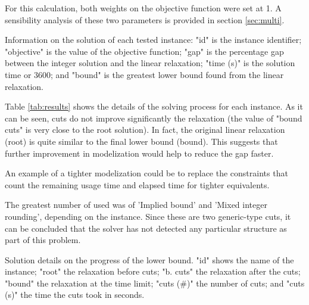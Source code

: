 \documentclass[a4paper,twocolumn,fleqn]{article}
\begin{document}
    For this calculation, both weights on the objective function were set at 1. A sensibility analysis of these two parameters is provided in section \ref{sec:multi}.

    \begin{table}
    \begin{center}

    

    \caption{Information on the solution of each tested instance: "id" is the instance identifier; "objective" is the value of the objective function; "gap" is the percentage gap between the integer solution and the linear relaxation; "time (s)" is the solution time or 3600; and "bound" is the greatest lower bound found from the linear relaxation.}
    \vspace{-0.5cm}
    \label{tab:summary}
    \end{center}
    \end{table}

    Table \ref{tab:results} shows the details of the solving process for each instance. As it can be seen, cuts do not improve significantly the relaxation (the value of "bound cuts" is very close to the root solution). In fact, the original linear relaxation (root) is quite similar to the final lower bound (bound). This suggests that further improvement in modelization would help to reduce the gap faster.

    An example of a tighter modelization could be to replace the constraints that count the remaining usage time and elapsed time for tighter equivalents.
    
    The greatest number of used was of 'Implied bound' and 'Mixed integer rounding', depending on the instance. Since these are two generic-type cuts, it can be concluded that the solver has not detected any particular structure as part of this problem.

    \begin{table}
    \begin{center}

    

    \caption{Solution details on the progress of the lower bound. "id" shows the name of the instance; "root" the relaxation before cuts; "b. cuts" the relaxation after the cuts; "bound" the relaxation at the time limit; "cuts (\#)" the number of cuts; and "cuts (s)" the time the cuts took in seconds.}
    \vspace{-0.5cm}
    \label{tab:results}
    \end{center}
    \end{table}
\end{document}
